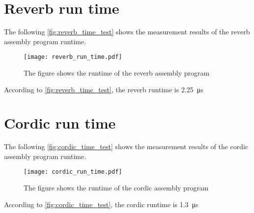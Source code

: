 \section*{Reverb run time}
The following \autoref{fig:reverb_time_test} shows the measurement results of the \gls{reverb} assembly program runtime.
\begin{figure}[htbp!]
	\centering
		\texttt{[image: reverb\_run\_time.pdf]}
		\caption{The figure shows the runtime of the \gls{reverb} assembly program}
		\label{fig:reverb_time_test}
\end{figure}

According to \autoref{fig:reverb_time_test}, the \gls{reverb} runtime is \SI{2.25}{\micro\second}

\section*{Cordic run time}
The following \autoref{fig:cordic_time_test} shows the measurement results of the cordic assembly program runtime.
\begin{figure}[htbp!]
	\centering
		\texttt{[image: cordic\_run\_time.pdf]}
		\caption{The figure shows the runtime of the cordic assembly program}
		\label{fig:cordic_time_test}
\end{figure}

According to \autoref{fig:cordic_time_test}, the cordic runtime is \SI{1.3}{\micro\second}